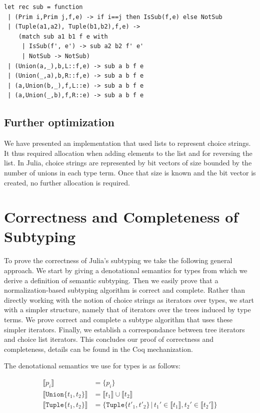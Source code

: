 \documentclass[a4paper,english]{lipics-v2019}
\newcommand{\xt}[1]{\texttt{#1}}
\newcommand{\tuplet}[2]{\xt{Tuple\{}#1,#2\xt{\}}}
\newcommand{\union}[2]{\xt{Union\{}#1,#2\xt{\}}}
\newcommand{\denotes}[1]{\llbracket #1 \rrbracket}
\begin{document}
\begin{lstlisting}
let rec sub = function
 | (Prim i,Prim j,f,e) -> if i==j then IsSub(f,e) else NotSub
 | (Tuple(a1,a2), Tuple(b1,b2),f,e) ->
    (match sub a1 b1 f e with
     | IsSub(f', e') -> sub a2 b2 f' e'
     | NotSub -> NotSub)
 | (Union(a,_),b,L::f,e) -> sub a b f e
 | (Union(_,a),b,R::f,e) -> sub a b f e
 | (a,Union(b,_),f,L::e) -> sub a b f e
 | (a,Union(_,b),f,R::e) -> sub a b f e
\end{lstlisting}

\subsection{Further optimization}

We have presented an implementation that used lists to represent choice
strings. It thus required allocation when adding elements to the list and
for reversing the list. In Julia, choice strings are represented by bit
vectors of size bounded by the number of unions in each type term.  Once
that size is known and the bit vector is created, no further allocation is
required.

\section{Correctness and Completeness of Subtyping}

To prove the correctness of Julia's subtyping we take the following general
approach. We start by giving a denotational semantics for types from which
we derive a definition of semantic subtyping. Then we easily prove that a
normalization-based subtyping algorithm is correct and complete. Rather than
directly working with the notion of choice strings as iterators over types,
we start with a simpler structure, namely that of iterators over the trees
induced by type terms. We prove correct and complete a subtype algorithm
that uses these simpler iterators. Finally, we establish a correspondance
between tree iterators and choice list iterators. This concludes our proof
of correctness and completeness, details can be found in the Coq
mechanization.

The denotational semantics we use for types is as follows:

\vspace{-5mm}
\begin{align*}
\denotes{p_i} &= \{p_i\} \\
\denotes{\union{t_1}{t_2}} &= \denotes{t_1} \cup \denotes{t_2} \\
\denotes{\tuplet{t_1}{t_2}} &= \{\tuplet{t'_1}{t'_2} \,|\, t_1' \in \denotes{t_1},  t_2' \in \denotes{t_2'}\}
\end{align*}
\vspace{-5mm}
\end{document}
